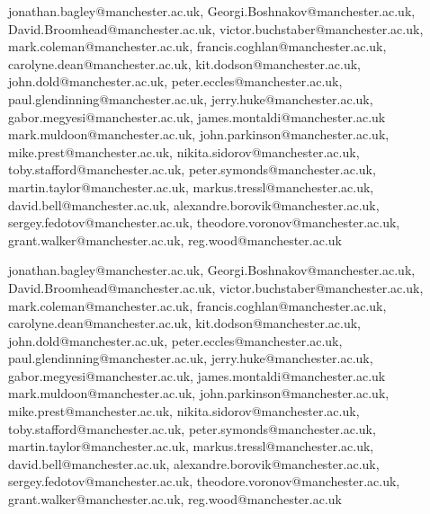           jonathan.bagley@manchester.ac.uk,
          Georgi.Boshnakov@manchester.ac.uk,
          David.Broomhead@manchester.ac.uk,
          victor.buchstaber@manchester.ac.uk,
          mark.coleman@manchester.ac.uk,
          francis.coghlan@manchester.ac.uk,
          carolyne.dean@manchester.ac.uk,
          kit.dodson@manchester.ac.uk,
          john.dold@manchester.ac.uk,
          peter.eccles@manchester.ac.uk,
          paul.glendinning@manchester.ac.uk,
          jerry.huke@manchester.ac.uk,
          gabor.megyesi@manchester.ac.uk,
          james.montaldi@manchester.ac.uk
          mark.muldoon@manchester.ac.uk,
          john.parkinson@manchester.ac.uk,
          mike.prest@manchester.ac.uk,
          nikita.sidorov@manchester.ac.uk,
          toby.stafford@manchester.ac.uk,
          peter.symonds@manchester.ac.uk,
          martin.taylor@manchester.ac.uk,
          markus.tressl@manchester.ac.uk,
          david.bell@manchester.ac.uk,
          alexandre.borovik@manchester.ac.uk,
          sergey.fedotov@manchester.ac.uk,
          theodore.voronov@manchester.ac.uk,
          grant.walker@manchester.ac.uk,
          reg.wood@manchester.ac.uk


         jonathan.bagley@manchester.ac.uk,
          Georgi.Boshnakov@manchester.ac.uk,
          David.Broomhead@manchester.ac.uk,
          victor.buchstaber@manchester.ac.uk,
          mark.coleman@manchester.ac.uk,
          francis.coghlan@manchester.ac.uk,
          carolyne.dean@manchester.ac.uk,
          kit.dodson@manchester.ac.uk,
          john.dold@manchester.ac.uk,
          peter.eccles@manchester.ac.uk,
          paul.glendinning@manchester.ac.uk,
          jerry.huke@manchester.ac.uk,
          gabor.megyesi@manchester.ac.uk,
          james.montaldi@manchester.ac.uk
          mark.muldoon@manchester.ac.uk,
          john.parkinson@manchester.ac.uk,
          mike.prest@manchester.ac.uk,
          nikita.sidorov@manchester.ac.uk,
          toby.stafford@manchester.ac.uk,
          peter.symonds@manchester.ac.uk,
          martin.taylor@manchester.ac.uk,
          markus.tressl@manchester.ac.uk,
          david.bell@manchester.ac.uk,
          alexandre.borovik@manchester.ac.uk,
          sergey.fedotov@manchester.ac.uk,
          theodore.voronov@manchester.ac.uk,
          grant.walker@manchester.ac.uk,
          reg.wood@manchester.ac.uk
